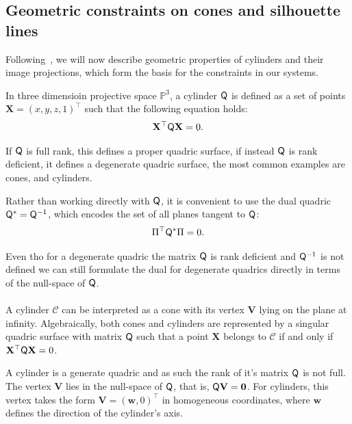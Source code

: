 \subsection{Geometric constraints on cones and  silhouette lines}
\label{sec:constraints}

Following~\cite{gummeson22pose, gummeson24relative}, we will now describe geometric properties of cylinders and their image projections, which form the basis for the constraints in our systems.

In three dimensioin projective space $\mathbb{P}^3$, a cylinder $\mathsf{Q}$ is defined as a set of points $\mathbf{X} = (x, y, z, 1)^\top$ such that the following equation holds:
\begin{equation}
	\mathbf{X}^\top \mathsf{Q} \mathbf{X} = 0.
\end{equation}

If $\mathsf{Q}$ is full rank, this defines a proper quadric surface, if instead $\mathsf{Q}$ is rank deficient, it defines a degenerate quadric surface, the most common examples are cones, and cylinders.

Rather than working directly with $\mathsf{Q}$, it is convenient to use the dual quadric $\mathsf{Q}^* = \mathsf{Q}^{-1}$, which encodes the set of all planes tangent to $\mathsf{Q}$:
\begin{equation}
	\Pi^\top \mathsf{Q}^* \Pi = 0.
\end{equation}

Even tho for a degenerate quadric the matrix $\mathsf{Q}$ is rank deficient and $\mathsf{Q}^{-1}$ is not defined we can still formulate the dual for degenerate quadrics directly in terms of the null-space of $\mathsf{Q}$. 

\paragraph{}A cylinder $\mathcal{C}$ can be interpreted as a cone with its vertex $\mathbf{V}$ lying on the plane at infinity. Algebraically, both cones and cylinders are represented by a singular quadric surface with matrix $\mathsf{Q}$ such that a point $\mathbf{X}$ belongs to $\mathcal{C}$ if and only if $\mathbf{X}^\top \mathsf{Q} \mathbf{X} = 0$.

A cylinder is a generate quadric and as such the rank of it's matrix $\mathsf{Q}$ is not full. The vertex $\mathbf{V}$ lies in the null-space of $\mathsf{Q}$, that is, $\mathsf{Q} \mathbf{V} = \mathbf{0}$. For cylinders, this vertex takes the form $\mathbf{V} = {(\mathbf{w}, 0)}^\top$ in homogeneous coordinates, where $\mathbf{w}$ defines the direction of the cylinder’s axis.

